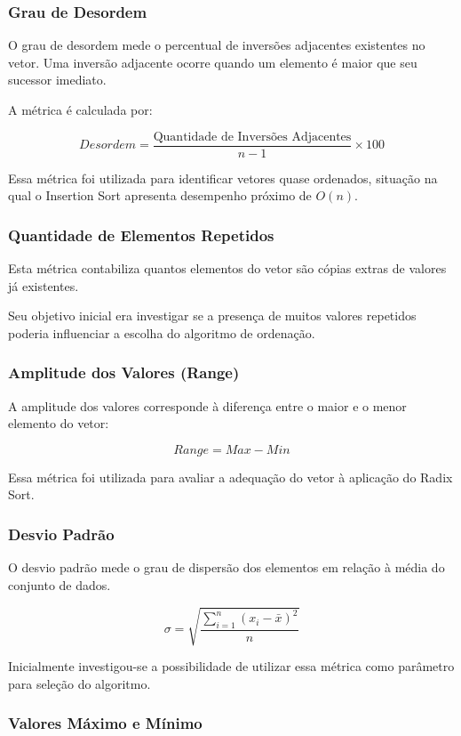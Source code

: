 \documentclass{article}
\begin{document}
\subsubsection{Grau de Desordem}

O grau de desordem mede o percentual de inversões adjacentes existentes no vetor. Uma inversão adjacente ocorre quando um elemento é maior que seu sucessor imediato.

A métrica é calculada por:

\[
Desordem = \frac{\text{Quantidade de Inversões Adjacentes}}{n-1}\times 100
\]

Essa métrica foi utilizada para identificar vetores quase ordenados, situação na qual o Insertion Sort apresenta desempenho próximo de \(O(n)\).

\subsubsection{Quantidade de Elementos Repetidos}

Esta métrica contabiliza quantos elementos do vetor são cópias extras de valores já existentes.

Seu objetivo inicial era investigar se a presença de muitos valores repetidos poderia influenciar a escolha do algoritmo de ordenação.

\subsubsection{Amplitude dos Valores (Range)}

A amplitude dos valores corresponde à diferença entre o maior e o menor elemento do vetor:

\[
Range = Max - Min
\]

Essa métrica foi utilizada para avaliar a adequação do vetor à aplicação do Radix Sort.

\subsubsection{Desvio Padrão}

O desvio padrão mede o grau de dispersão dos elementos em relação à média do conjunto de dados.

\[
\sigma = \sqrt{\frac{\sum_{i=1}^{n}(x_i-\bar{x})^2}{n}}
\]

Inicialmente investigou-se a possibilidade de utilizar essa métrica como parâmetro para seleção do algoritmo.

\subsubsection{Valores Máximo e Mínimo}
\end{document}
